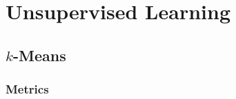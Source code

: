 \chapter{Unsupervised Learning}
\label{ml:unsupervised}

\section{\texorpdfstring{$k$}{k}-Means}
\label{ml:unsupervised:kMean}

\subsection{Metrics}
\label{ml:unsupervised:kMean:metrics}

